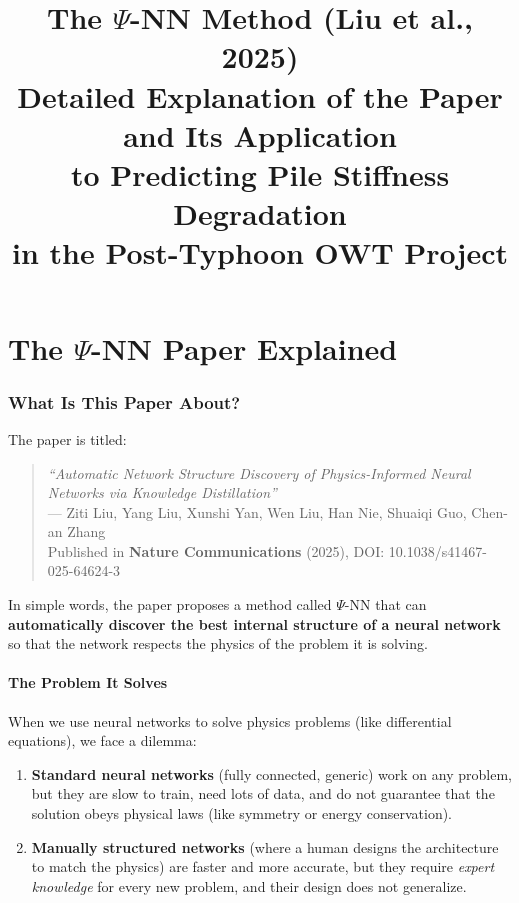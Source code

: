 \documentclass[11pt,a4paper]{article}
\title{\textbf{The $\Psi$-NN Method (Liu et al., 2025)}\\[0.3cm]
\large Detailed Explanation of the Paper and Its Application\\[0.1cm]
to Predicting Pile Stiffness Degradation\\[0.1cm]
in the Post-Typhoon OWT Project}
\author{}
\date{}
\begin{document}
\maketitle
\tableofcontents
\newpage


\part{The $\Psi$-NN Paper Explained}

\section{What Is This Paper About?}

The paper is titled:

\begin{quote}
\textit{``Automatic Network Structure Discovery of Physics-Informed Neural Networks via Knowledge Distillation''}\\
--- Ziti Liu, Yang Liu, Xunshi Yan, Wen Liu, Han Nie, Shuaiqi Guo, Chen-an Zhang\\
Published in \textbf{Nature Communications} (2025), DOI: 10.1038/s41467-025-64624-3
\end{quote}

In simple words, the paper proposes a method called $\Psi$-NN that can \textbf{automatically discover the best internal structure of a neural network} so that the network respects the physics of the problem it is solving.

\subsection{The Problem It Solves}

When we use neural networks to solve physics problems (like differential equations), we face a dilemma:

\begin{enumerate}[nosep]
    \item \textbf{Standard neural networks} (fully connected, generic) work on any problem, but they are slow to train, need lots of data, and do not guarantee that the solution obeys physical laws (like symmetry or energy conservation).
    \item \textbf{Manually structured networks} (where a human designs the architecture to match the physics) are faster and more accurate, but they require \textit{expert knowledge} for every new problem, and their design does not generalize.
\end{enumerate}
\end{document}
